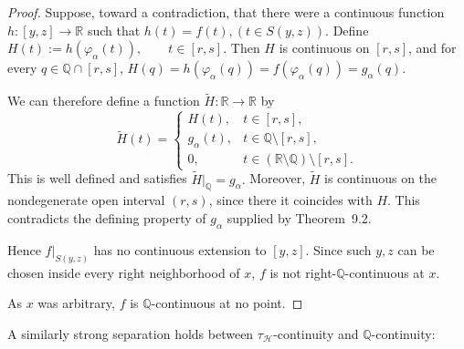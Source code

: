 \documentclass[11pt]{amsart} %
\theoremstyle{definition}
\newcommand{\Q}{\mathbb{Q}}
\newcommand{\AD}{\mathcal{H}}
\begin{document}
\begin{proof}
Suppose, toward a contradiction, that there were a continuous function
$h\colon[y,z]\to\mathbb R$
such that $h(t)=f(t), (t\in S(y,z)).$
Define
$H(t):=h(\varphi_\alpha(t)),
\qquad t\in[r,s].$ 
Then $H$ is continuous on $[r,s]$, and for every
$q\in\mathbb Q\cap[r,s]$, $
H(q)
=
h(\varphi_\alpha(q))
=
f(\varphi_\alpha(q))
=
g_\alpha(q)$. 

We can therefore define a function
$\widetilde H\colon\mathbb R\to\mathbb R$ by
\begin{equation} 
\widetilde H(t)=
\begin{cases}
H(t), & t\in[r,s],\\
g_\alpha(t), & t\in\mathbb Q\setminus[r,s],\\
0, & t\in(\mathbb R\setminus\mathbb Q)\setminus[r,s].
\end{cases}
\end{equation} 
This is well defined and satisfies
$\widetilde H|_{\mathbb Q}=g_\alpha.$
Moreover, $\widetilde H$ is continuous on the nondegenerate open
interval $(r,s)$, since there it coincides with $H$. This contradicts
the defining property of $g_\alpha$ supplied by Theorem~9.2.

Hence $f|_{S(y,z)}$ has no continuous extension to $[y,z]$. Since such
$y,z$ can be chosen inside every right neighborhood of $x$, $f$ is
not right-$\mathbb Q$-continuous at $x$.

As $x$ was arbitrary, $f$ is $\mathbb Q$-continuous at no point.
\end{proof}

A similarly strong separation holds between $\tau_{\AD}$-continuity and $\Q$-continuity: 
\end{document}

